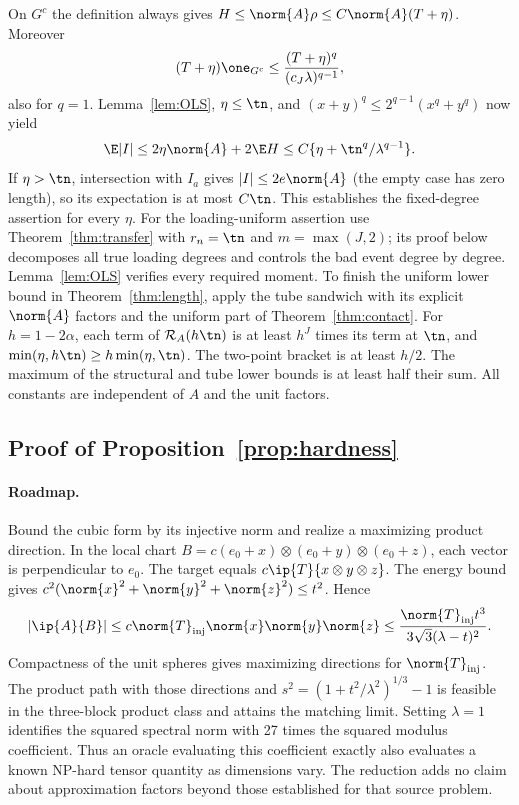 On $G^c$ the definition always gives $H\le\norm{A}\rho\le C\norm{A}(T+\eta)$. Moreover
\[
 (T+\eta)\one_{G^c}\le
 \frac{(T+\eta)^q}{(c_J\lambda)^{q-1}},
\]
also for $q=1$. Lemma~\ref{lem:OLS}, $\eta\le\tn$, and $(x+y)^q\le2^{q-1}(x^q+y^q)$ now yield
\[
 \E|I|\le2\eta\norm{A}+2\E H
 \le C\{\eta+\tn^q/\lambda^{q-1}\}.
\]
If $\eta>\tn$, intersection with $I_a$ gives $|I|\le2e\norm{A}$ (the empty case has zero length), so its expectation is at most $C\tn$. This establishes the fixed-degree assertion for every $\eta$. For the loading-uniform assertion use Theorem~\ref{thm:transfer} with $r_n=\tn$ and $m=\max(J,2)$; its proof below decomposes all true loading degrees and controls the bad event degree by degree. Lemma~\ref{lem:OLS} verifies every required moment. To finish the uniform lower bound in Theorem~\ref{thm:length}, apply the tube sandwich with its explicit $\norm{A}$ factors and the uniform part of Theorem~\ref{thm:contact}. For $h=1-2\alpha$, each term of $\mathcal R_A(h\tn)$ is at least $h^J$ times its term at $\tn$, and $\min(\eta,h\tn)\ge h\min(\eta,\tn)$. The two-point bracket is at least $h/2$. The maximum of the structural and tube lower bounds is at least half their sum. All constants are independent of $A$ and the unit factors.

\subsection{Proof of Proposition~\ref{prop:hardness}}
\paragraph{Roadmap.} Bound the cubic form by its injective norm and realize a maximizing product direction.
In the local chart $B=c(e_0+x)\otimes(e_0+y)\otimes(e_0+z)$, each vector is perpendicular to $e_0$. The target equals $c\ip{T}{x\otimes y\otimes z}$. The energy bound gives $c^2(\norm{x}^2+\norm{y}^2+\norm{z}^2)\le t^2$. Hence
\[
 |\ip{A}{B}|\le c\norm{T}_{\rm inj}\norm{x}\norm{y}\norm{z}
 \le\frac{\norm{T}_{\rm inj}t^3}{3\sqrt3(\lambda-t)^2}.
\]
Compactness of the unit spheres gives maximizing directions for $\norm{T}_{\rm inj}$. The product path with those directions and $s^2=(1+t^2/\lambda^2)^{1/3}-1$ is feasible in the three-block product class and attains the matching limit. Setting $\lambda=1$ identifies the squared spectral norm with 27 times the squared modulus coefficient. Thus an oracle evaluating this coefficient exactly also evaluates a known NP-hard tensor quantity as dimensions vary. The reduction adds no claim about approximation factors beyond those established for that source problem.


